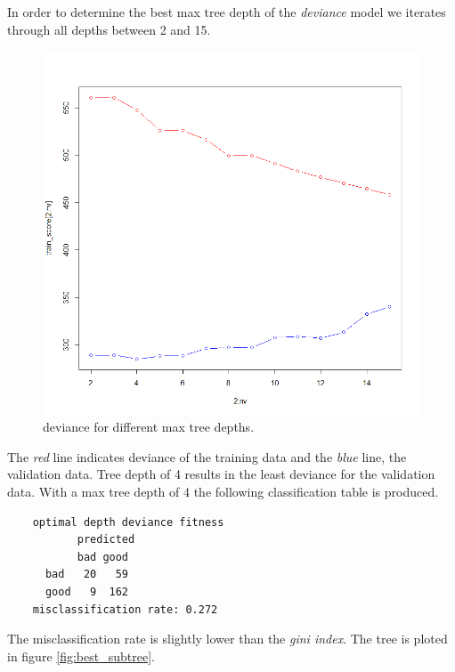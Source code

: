 \documentclass[a4paper, twocolumn]{article}
\begin{document}
	In order to determine the best max tree depth of the \textit{deviance} model we iterates through all depths between 2 and 15.
	\begin{figure}
	\centering
	\begin{minipage}[]{0.5\textwidth}
	  \includegraphics[width=\textwidth]{share/depth_tree.png}  
	  \caption{deviance for different max tree depths.\label{fig:tree_depth}}
	 \end{minipage}
	\end{figure}
	The \textit{red} line indicates deviance of the training data and the \textit{blue} line, the validation data. Tree depth of 4 results in the least deviance for the validation data. With a max tree depth of 4 the following classification table is produced.
	\begin{verbatim}
	optimal depth deviance fitness
	       predicted
	       bad good
	  bad   20   59
	  good   9  162
	misclassification rate: 0.272
	\end{verbatim}
	The misclassification rate is slightly lower than the \textit{gini index}. The tree is ploted in figure \ref{fig:best_subtree}.
\end{document}
